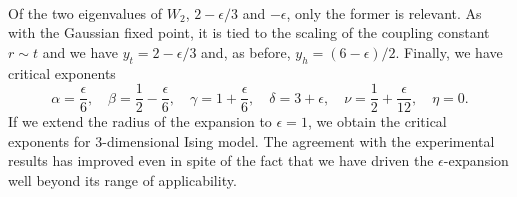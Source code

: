 \\
Of the two eigenvalues of $W_2$, $2 - {\epsilon}/{3}$ and $-\epsilon$, only the former is relevant. As with the Gaussian fixed point, it is tied to the scaling of the coupling constant $r \sim t$ and we have $y_t = 2 - {\epsilon}/{3}$ and, as before, $y_h = (6-\epsilon)/{2}$. Finally, we have critical exponents
\[\alpha = \frac{\epsilon}{6} , \quad \beta = \frac{1}{2} - \frac{\epsilon}{6} , \quad \gamma = 1 + \frac{\epsilon}{6} , \quad \delta = 3 + \epsilon , \quad \nu = \frac{1}{2} + \frac{\epsilon}{12} , \quad \eta = 0.\]
If we extend the radius of the expansion to $\epsilon = 1$,
we obtain the critical exponents for 3-dimensional Ising model. The agreement with the experimental results has improved even in spite of the fact that we have driven the $\epsilon$-expansion well beyond its range of applicability.